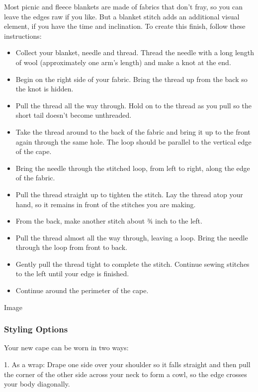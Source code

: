Most picnic and fleece blankets are made of fabrics that don't fray, so
you can leave the edges raw if you like. But a blanket stitch adds an
additional visual element, if you have the time and inclination. To
create this finish, follow these instructions:

\begin{itemize}
\item
  Collect your blanket, needle and thread. Thread the needle with a long
  length of wool (approximately one arm's length) and make a knot at the
  end.
\item
  Begin on the right side of your fabric. Bring the thread up from the
  back so the knot is hidden.
\item
  Pull the thread all the way through. Hold on to the thread as you pull
  so the short tail doesn't become unthreaded.
\item
  Take the thread around to the back of the fabric and bring it up to
  the front again through the same hole. The loop should be parallel to
  the vertical edge of the cape.
\item
  Bring the needle through the stitched loop, from left to right, along
  the edge of the fabric.
\item
  Pull the thread straight up to tighten the stitch. Lay the thread atop
  your hand, so it remains in front of the stitches you are making.
\item
  From the back, make another stitch about ¾ inch to the left.
\item
  Pull the thread almost all the way through, leaving a loop. Bring the
  needle through the loop from front to back.
\item
  Gently pull the thread tight to complete the stitch. Continue sewing
  stitches to the left until your edge is finished.
\item
  Continue around the perimeter of the cape.
\end{itemize}

Image

\hypertarget{styling-options}{%
\subsubsection{\texorpdfstring{\textbf{Styling
Options}}{Styling Options}}\label{styling-options}}

Your new cape can be worn in two ways:

1. As a wrap: Drape one side over your shoulder so it falls straight and
then pull the corner of the other side across your neck to form a cowl,
so the edge crosses your body diagonally.

